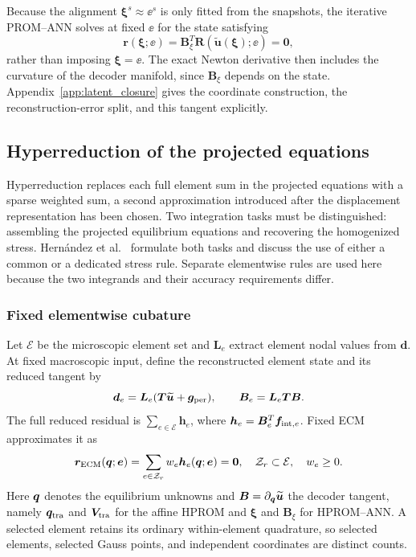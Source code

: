 Because the alignment $\bm\xi^s\approx\ee^s$ is only fitted from the snapshots, the iterative PROM--ANN solves at fixed $\ee$ for the state satisfying
\begin{equation}
 \bm r(\bm\xi;\ee)=\bm B_\xi^T
       \bm R(\widetilde{\bm u}(\bm\xi);\ee)=\bm0,
 \label{eq:manifold_galerkin}
\end{equation}
rather than imposing $\bm\xi=\ee$. The exact Newton derivative then includes the curvature of the decoder manifold, since $\bm B_\xi$ depends on the state. Appendix~\ref{app:latent_closure} gives the coordinate construction, the reconstruction-error split, and this tangent explicitly.

\subsection{Hyperreduction of the projected equations}
\label{sec:hyperreduction}
Hyperreduction replaces each full element sum in the projected equations with a sparse weighted sum, a second approximation introduced after the displacement representation has been chosen. Two integration tasks must be distinguished: assembling the projected equilibrium equations and recovering the homogenized stress. Hernández et al.~\cite{hernandez2026dimensional} formulate both tasks and discuss the use of either a common or a dedicated stress rule. Separate elementwise rules are used here because the two integrands and their accuracy requirements differ.

\subsubsection{Fixed elementwise cubature}
Let $\mathcal E$ be the microscopic element set and $\bm L_e$ extract element nodal values from $\bm d$. At fixed macroscopic input, define the reconstructed element state and its reduced tangent by
\begin{equation}
 \bm d_e=\bm L_e(\bm T\widetilde{\bm u}+\bm g_{\rm per}),
 \qquad \bm B_e=\bm L_e\bm T\bm B .
\end{equation}
The full reduced residual is $\sum_{e\in\mathcal E}\bm h_e$, where
$\bm h_e=\bm B_e^T\bm f_{{\rm int},e}$. Fixed ECM approximates it as
\begin{equation}
 \bm r_{\rm ECM}(\bm q;\bm e)=
       \sum_{e\in\mathcal Z_r}w_e\bm h_e(\bm q;\bm e)=\bm0,
 \quad \mathcal Z_r\subset\mathcal E,\quad w_e\geq0.
 \label{eq:ecm}
\end{equation}
Here $\bm q$ denotes the equilibrium unknowns and $\bm B=\partial_{\bm q}\widetilde{\bm u}$ the decoder tangent, namely $\bm q_{\rm tra}$ and $\bm V_{\rm tra}$ for the affine HPROM and $\bm\xi$ and $\bm B_\xi$ for HPROM--ANN. A selected element retains its ordinary within-element quadrature, so selected elements, selected Gauss points, and independent coordinates are distinct counts.

